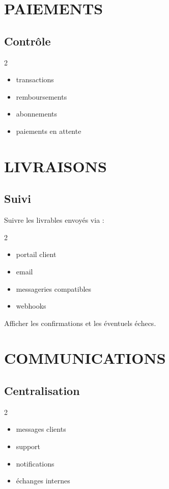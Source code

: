 \documentclass[12pt,a4paper,oneside]{book}
\begin{document}
\chapter{PAIEMENTS}

\section{Contrôle}
\begin{multicols}{2}
\begin{itemize}
\item transactions
\item remboursements
\item abonnements
\item paiements en attente
\end{itemize}
\end{multicols}

\chapter{LIVRAISONS}

\section{Suivi}
Suivre les livrables envoyés via :
\begin{multicols}{2}
\begin{itemize}
\item portail client
\item email
\item messageries compatibles
\item webhooks
\end{itemize}
\end{multicols}

Afficher les confirmations et les éventuels échecs.

\chapter{COMMUNICATIONS}

\section{Centralisation}
\begin{multicols}{2}
\begin{itemize}
\item messages clients
\item support
\item notifications
\item échanges internes
\end{itemize}
\end{multicols}
\end{document}
